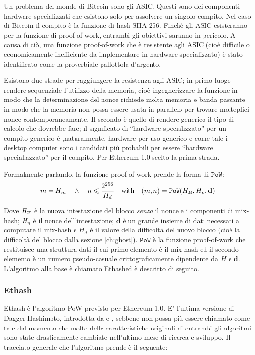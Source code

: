 \documentclass[9pt,oneside]{amsart}
\newcommand{\hcancel}[1]{%
    \tikz[baseline=(tocancel.base)]{
        \node[inner sep=0pt,outer sep=0pt] (tocancel) {#1};
        \draw[black] (tocancel.south west) -- (tocancel.north east);
    }%
}%
\begin{document}
\begin{multicols}{2}
Un problema del mondo di Bitcoin sono gli ASIC. Questi sono dei componenti hardware specializzati che esistono solo per assolvere un singolo compito. Nel caso di Bitcoin il compito è la funzione di hash SHA 256. Finchè gli ASIC esisteranno per la funzione di proof-of-work, entrambi gli obiettivi saranno in pericolo. A causa di ciò, una funzione proof-of-work che è resistente agli ASIC (cioè difficile o economicamente inefficiente da implementare in hardware specializzato) è stato identificato come la proverbiale pallottola d'argento.

Esistono due strade per raggiungere la resistenza agli ASIC; in primo luogo rendere sequenziale l'utilizzo della memoria, cioè ingegnerizzare la funzione in modo che la determinazione del nonce richiede molta memoria e banda passante in modo che la memoria non possa essere usata in parallelo per trovare molteplici nonce contemporaneamente. Il secondo è quello di rendere generico il tipo di calcolo che dovrebbe fare; il significato di ``hardware specializzato'' per un compito generico è ,naturalmente, hardware per uso generico e come tale i desktop computer sono i candidati più probabili per essere ``hardware specialiazzato'' per il compito. Per Ethereum 1.0 scelto la prima strada.

Formalmente parlando, la funzione proof-of-work prende la forma di $\mathtt{PoW}$:
\begin{equation}
m = H_m \quad \wedge \quad n \leqslant \frac{2^{256}}{H_d} \quad \text{with} \quad (m, n) = \mathtt{PoW}(H_{\hcancel{n}}, H_n, \mathbf{d})
\end{equation}

Dove $H_{\hcancel{n}}$ è la nuova intestazione del blocco \textit{senza} il nonce e i componenti di mix-hash; $H_n$ è il nonce dell'intestazione; $\mathbf{d}$ è un grande insieme di dati necessari a computare il mix-hash e $H_d$ è il valore della difficoltà del nuovo blocco (cioè la difficoltà del blocco dalla sezione \ref{ch:ghost}). $\mathtt{PoW}$ è la funzione proof-of-work che restituisce  una struttura dati il cui primo elemento è il mix-hash ed il secondo elemento è un numero pseudo-casuale crittograficamente dipendente da $H$ e $\mathbf{d}$. L'algoritmo alla base è chiamato Ethashed è descritto di seguito.
\subsubsection{Ethash}
Ethash è l'algoritmo PoW previsto per Ethereum 1.0. E' l'ultima versione di Dagger-Hashimoto, introdotta da \cite{dagger} e \cite{hashimoto}, sebbene non possa più essere chiamato come tale dal momento che molte delle caratteristiche originali di entrambi gli algoritmi sono state drasticamente cambiate nell'ultimo mese di ricerca e sviluppo. Il tracciato generale che l'algoritmo prende è il seguente:


\end{multicols}
\end{document}
